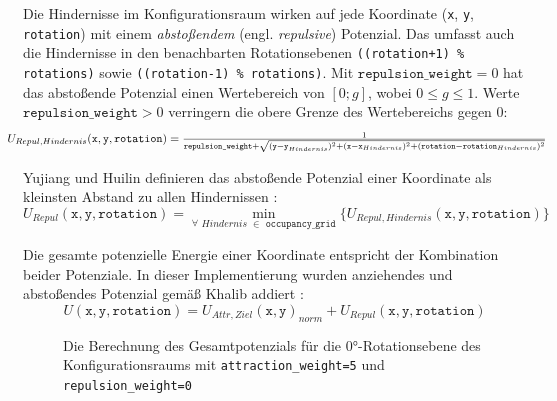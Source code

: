 Die Hindernisse im Konfigurationsraum wirken auf jede Koordinate (\texttt{x}, \texttt{y}, \texttt{rotation}) mit einem \textit{abstoßendem} (engl. \textit{repulsive}) Potenzial. Das umfasst auch die Hindernisse in den benachbarten Rotationsebenen \texttt{((rotation+1) \% rotations)} sowie \texttt{((rotation-1) \% rotations)}. Mit $\texttt{repulsion\_weight}=0$ hat das abstoßende Potenzial einen Wertebereich von $[0;g]$, wobei $0\le g \le 1$. Werte $\texttt{repulsion\_weight} > 0 $ verringern die obere Grenze des Wertebereichs gegen $0$: \cite{schweiger.2023}
\vspace*{0.25cm}
\begin{equation*}
\hspace*{-0.075\linewidth}
\resizebox{1.15\linewidth}{!}{
  $ U_{Repul, Hindernis}(\texttt{x}, \texttt{y}, \texttt{rotation}) = \frac{1}{\texttt{repulsion\_weight} + \sqrt{(\texttt{y} - \texttt{y}_{Hindernis})^2 + (\texttt{x} - \texttt{x}_{Hindernis})^2 + (\texttt{rotation} - \texttt{rotation}_{Hindernis})^2}}
$}
\hspace*{-0.075\linewidth}
\end{equation*}

\vspace*{0.05cm}
Yujiang und Huilin definieren das abstoßende Potenzial einer Koordinate als kleinsten Abstand zu allen Hindernissen \cite{yujiang.2017}:
\vspace*{0.3cm}
\begin{equation*}
U_{Repul}(\texttt{x}, \texttt{y}, \texttt{rotation}) = \min_{\forall \,\,Hindernis \,\,\in \texttt{ occupancy\_grid}} \{ U_{Repul, Hindernis}(\texttt{x}, \texttt{y}, \texttt{rotation}) \}
\end{equation*}

Die gesamte potenzielle Energie einer Koordinate entspricht der Kombination beider Potenziale. In dieser Implementierung wurden anziehendes und abstoßendes Potenzial gemäß Khalib addiert \cite{khatib.1985}:
\vspace*{0.25cm}
\begin{equation*}
U(\texttt{x}, \texttt{y}, \texttt{rotation}) = U_{Attr, Ziel}(\texttt{x}, \texttt{y})_{norm} + U_{Repul}(\texttt{x}, \texttt{y}, \texttt{rotation})
\end{equation*}
\begin{figure}[H]
	\centering
	\footnotesize
	\centerline{}
	\caption{Die Berechnung des Gesamtpotenzials für die $0$°-Rotationsebene des Konfigurationsraums mit \texttt{attraction\_weight=5} und \texttt{repulsion\_weight=0}}
\end{figure}

